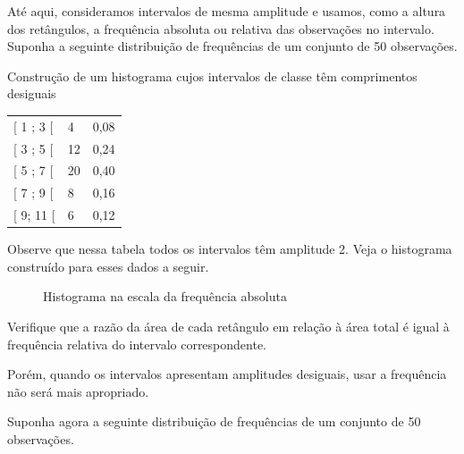 Até aqui, consideramos intervalos de mesma amplitude e usamos, como a altura dos retângulos, a frequência absoluta ou relativa das observações no intervalo. Suponha a seguinte distribuição de frequências de um conjunto de 50 observações.

\begin{example}{Construção de um histograma cujos intervalos de classe têm comprimentos desiguais}

\begin{savenotes}\sphinxattablestart
\centering
\begin{tabulary}{\linewidth}[t]{|T|T|T|}
\hline
{}\relax &\relax &\relax \\
\hline
{[} 1 ; 3 {[}
&
4
&
0,08
\\
\hline
{[} 3 ; 5 {[}
&
12
&
0,24
\\
\hline
{[} 5 ; 7 {[}
&
20
&
0,40
\\
\hline
{[} 7 ; 9 {[}
&
8
&
0,16
\\
\hline
{[} 9; 11 {[}
&
6
&
0,12
\\
\hline
\end{tabulary}
\par
\sphinxattableend\end{savenotes}

Observe que nessa tabela todos os intervalos têm amplitude 2. Veja o histograma construído para esses dados a seguir.

\begin{figure}[H]
\centering
\capstart

\noindent{}
\caption{Histograma na escala da frequência absoluta}\label{\detokenize{PE103-4:id7}}\end{figure}

Verifique que a razão da área de cada retângulo em relação à área total é igual à frequência relativa do intervalo correspondente.

Porém, quando os intervalos apresentam amplitudes desiguais, usar a frequência não será mais apropriado.

Suponha agora a seguinte distribuição de frequências de um conjunto de 50 observações.



\end{example}
